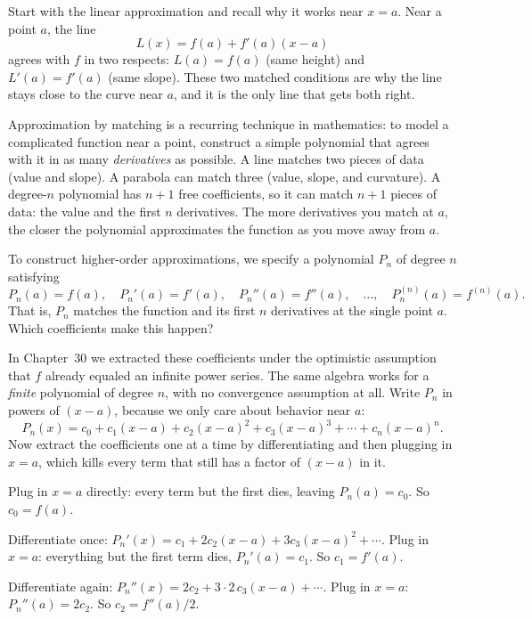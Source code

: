 Start with the linear approximation and recall why it works near $x=a$. Near a point $a$,
the line
\[
  L(x) = f(a) + f'(a)(x-a)
\]
agrees with $f$ in two respects: $L(a) = f(a)$ (same height) and $L'(a) = f'(a)$
(same slope). These two matched conditions are why the line stays close to
the curve near $a$, and it is the only line that gets both right.

\begin{intuitionbox}
Approximation by matching is a recurring technique in mathematics: to model a
complicated function near a point, construct a simple polynomial that agrees with it in as many
\emph{derivatives} as possible. A line matches two pieces of data (value and
slope). A parabola can match three (value, slope, and curvature). A degree-$n$
polynomial has $n+1$ free coefficients, so it can match $n+1$ pieces of data: the
value and the first $n$ derivatives. The more derivatives you match at $a$, the
closer the polynomial approximates the function as you move away from $a$.
\end{intuitionbox}

To construct higher-order approximations, we specify a polynomial $P_n$ of degree $n$ satisfying
\[
  P_n(a) = f(a), \quad P_n'(a) = f'(a), \quad P_n''(a) = f''(a), \quad \dots, \quad
  P_n^{(n)}(a) = f^{(n)}(a).
\]
That is, $P_n$ matches the function and its first $n$ derivatives at the single
point $a$. Which coefficients make this happen?

In Chapter~30 we extracted these coefficients under the optimistic assumption that $f$
already equaled an infinite power series. The same algebra works for a \emph{finite}
polynomial of degree $n$, with no convergence assumption at all. Write $P_n$ in powers of
$(x-a)$, because we only care about behavior near $a$:
\[
  P_n(x) = c_0 + c_1(x-a) + c_2(x-a)^2 + c_3(x-a)^3 + \cdots + c_n(x-a)^n.
\]
Now extract the coefficients one at a time by differentiating and then plugging in
$x=a$, which kills every term that still has a factor of $(x-a)$ in it.

Plug in $x=a$ directly: every term but the first dies, leaving $P_n(a) = c_0$. So
$c_0 = f(a)$.

Differentiate once: $P_n'(x) = c_1 + 2c_2(x-a) + 3c_3(x-a)^2 + \cdots$. Plug in
$x=a$: everything but the first term dies, $P_n'(a) = c_1$. So $c_1 = f'(a)$.

Differentiate again: $P_n''(x) = 2c_2 + 3\cdot 2\, c_3 (x-a) + \cdots$. Plug in
$x=a$: $P_n''(a) = 2c_2$. So $c_2 = f''(a)/2$.


